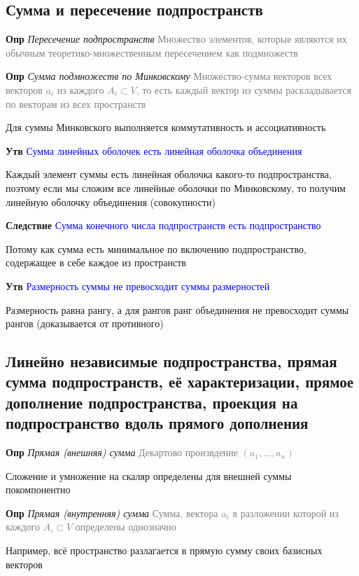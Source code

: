 \subsection{Сумма и пересечение подпространств}

\textbf{Опр} \textit{Пересечение подпространств} \textcolor{gray}{Множество элементов, которые являются их
обычным теоретико-множественным пересечением как подмножеств}

\textbf{Опр} \textit{Сумма подмножеств по Минковскому} \textcolor{gray}{Множество-сумма векторов всех векторов $
a_i$ из каждого $A_i \subset V$, то есть каждый вектор из суммы раскладывается по векторам из всех пространств}

Для суммы Минковского выполняется коммутативность и ассоциативность

\textbf{Утв} \textcolor{blue}{Сумма линейных оболочек есть линейная оболочка объединения}

Каждый элемент суммы есть линейная оболочка какого-то подпространства, поэтому если мы сложим все линейные
оболочки по Минковскому, то получим линейную оболочку объединения (совокупности)

\textbf{Следствие} \textcolor{blue}{Сумма конечного числа подпространств есть подпространство}

Потому как сумма есть минимальное по включению подпространство, содержащее в себе каждое из пространств

\textbf{Утв} \textcolor{blue}{Размерность суммы не превосходит суммы размерностей}

Размерность равна рангу, а для рангов ранг объединения не превосходит суммы рангов (доказывается от противного)

\subsection{Линейно независимые подпространства, прямая сумма подпространств, её характеризации, прямое дополнение
подпространства, проекция на подпространство вдоль прямого дополнения}

\textbf{Опр} \textit{Прямая (внешняя) сумма} \textcolor{gray}{Декартово произвдение $(a_1, \dots, a_n)$}

Сложение и умножение на скаляр определены для внешней суммы покомпонентно

\textbf{Опр} \textit{Прямая (внутренняя) сумма} \textcolor{gray}{Сумма, вектора $
a_i$ в разложении которой из каждого $A_i \subset V$ определены однозначно}

Например, всё пространство разлагается в прямую сумму своих базисных векторов

